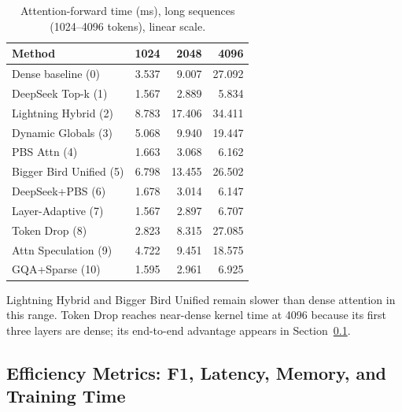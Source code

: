 \documentclass[11pt]{article}
\begin{document}
\begin{table}[ht]
  \centering
  \small
  \caption{Attention-forward time (ms), long sequences (1024--4096 tokens),
  linear scale.}
  \label{tab:long}
  \begin{tabular}{@{}lrrr@{}}
    \toprule
    Method & 1024 & 2048 & 4096 \\
    \midrule
    Dense baseline (0)        & 3.537 & 9.007  & 27.092 \\
    DeepSeek Top-k (1)        & 1.567 & 2.889  & 5.834 \\
    Lightning Hybrid (2)      & 8.783 & 17.406 & 34.411 \\
    Dynamic Globals (3)       & 5.068 & 9.940  & 19.447 \\
    PBS Attn (4)              & 1.663 & 3.068  & 6.162 \\
    Bigger Bird Unified (5)   & 6.798 & 13.455 & 26.502 \\
    DeepSeek+PBS (6)          & 1.678 & 3.014  & 6.147 \\
    Layer-Adaptive (7)        & 1.567 & 2.897  & 6.707 \\
    Token Drop (8)            & 2.823 & 8.315  & 27.085 \\
    Attn Speculation (9)      & 4.722 & 9.451  & 18.575 \\
    GQA+Sparse (10)           & 1.595 & 2.961  & 6.925 \\
    \bottomrule
  \end{tabular}
\end{table}

Lightning Hybrid and Bigger Bird Unified remain slower than dense attention
in this range. Token Drop reaches near-dense kernel time at 4096 because its
first three layers are dense; its end-to-end advantage appears in
Section~\ref{sec:efficiency}.

\subsection{Efficiency Metrics: F1, Latency, Memory, and Training Time}
\label{sec:efficiency}
\end{document}
